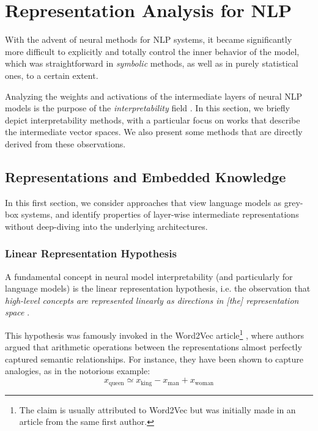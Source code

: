 \section{Representation Analysis for NLP}
With the advent of neural methods for NLP systems, it became significantly more difficult to explicitly and totally control the inner behavior of the model, which was straightforward in \textit{symbolic} methods, as well as in purely statistical ones, to a certain extent. 

Analyzing the weights and activations of the intermediate layers of neural NLP models is the purpose of the \textit{interpretability} field \citep{interpretability_survey}. In this section, we briefly depict interpretability methods, with a particular focus on works that describe the intermediate vector spaces. We also present some methods that are directly derived from these observations.

\subsection{Representations and Embedded Knowledge}
In this first section, we consider approaches that view language models as grey-box systems, and identify properties of layer-wise intermediate representations without deep-diving into the underlying architectures.

\subsubsection{Linear Representation Hypothesis}
A fundamental concept in neural model interpretability (and particularly for language models) is the linear representation hypothesis, i.e. the observation that \textit{high-level concepts are represented linearly as directions in [the] representation space} \citep{park2024the}.

This hypothesis was famously invoked in the Word2Vec article\footnote{The claim is usually attributed to Word2Vec but was initially made in an article from the same first author.} \citep{mikolov-etal-2013-linguistic}, where authors argued that arithmetic operations between the representations almost perfectly captured semantic relationships. For instance, they have been shown to capture analogies, as in the notorious example:
$$
x_{\text{queen}} \simeq x_{\text{king}} - x_{\text{man}} + x_{\text{woman}}
$$

